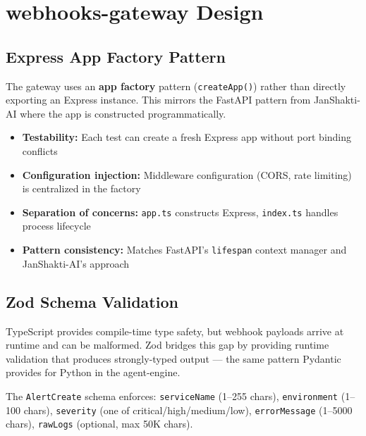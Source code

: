 \documentclass[11pt,a4paper]{article}
\begin{document}
\section{webhooks-gateway Design}

\subsection{Express App Factory Pattern}

The gateway uses an \textbf{app factory} pattern (\texttt{createApp()}) rather than
directly exporting an Express instance. This mirrors the FastAPI pattern from
JanShakti-AI where the app is constructed programmatically.

\begin{tcolorbox}[colback=primary!5, colframe=primary, sharp corners, title=\textbf{Why an app factory?}]
\begin{itemize}[leftmargin=*,itemsep=2pt]
  \item \textbf{Testability:} Each test can create a fresh Express app without port binding conflicts
  \item \textbf{Configuration injection:} Middleware configuration (CORS, rate limiting) is centralized in the factory
  \item \textbf{Separation of concerns:} \texttt{app.ts} constructs Express, \texttt{index.ts} handles process lifecycle
  \item \textbf{Pattern consistency:} Matches FastAPI's \texttt{lifespan} context manager and JanShakti-AI's approach
\end{itemize}
\end{tcolorbox}

\subsection{Zod Schema Validation}

\begin{decisionbox}
TypeScript provides compile-time type safety, but webhook payloads arrive at runtime and
can be malformed. Zod bridges this gap by providing runtime validation that produces
strongly-typed output — the same pattern Pydantic provides for Python in the agent-engine.
\end{decisionbox}

The \texttt{AlertCreate} schema enforces: \texttt{serviceName} (1--255 chars), \texttt{environment} (1--100 chars), \texttt{severity} (one of critical/high/medium/low), \texttt{errorMessage} (1--5000 chars), \texttt{rawLogs} (optional, max 50K chars).
\end{document}
